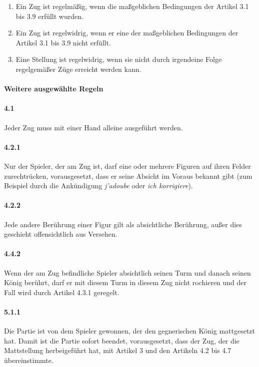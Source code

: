 \documentclass[
  a4paper,
  justified,
  nobib,
]{tufte-handout}
\begin{document}
\begin{enumerate}[{3}.1]
  \begin{enumerate}[{3.10}.1]
    \item Ein Zug ist regelmäßig, wenn die maßgeblichen Bedingungen der Artikel 3.1 bis
      3.9 erfüllt wurden.
    \item Ein Zug ist regelwidrig, wenn er eine der maßgeblichen Bedingungen der Artikel
      3.1 bis 3.9 nicht erfüllt.
    \item Eine Stellung ist regelwidrig, wenn sie nicht durch irgendeine Folge
      regelgemäßer Züge erreicht werden kann.
  \end{enumerate}
\end{enumerate}

\paragraph{Weitere ausgewählte Regeln}%
\label{par:weitere_ausgewahlte_regeln}

\paragraph{4.1} Jeder Zug muss mit einer Hand alleine ausgeführt werden.
\paragraph{4.2.1} Nur der Spieler, der am Zug ist, darf eine oder mehrere Figuren auf
ihren Felder zurechtrücken, vorausgesetzt, dass er seine Absicht im Voraus bekannt gibt
(zum Beispiel durch die Ankündigung \emph{j’adoube} oder \emph{ich korrigiere}).
\paragraph{4.2.2} Jede andere Berührung einer Figur gilt als absichtliche Berührung, außer
dies geschieht offensichtlich aus Versehen.
\paragraph{4.4.2} Wenn der am Zug befindliche Spieler absichtlich seinen Turm und danach
seinen König berührt, darf er mit diesem Turm in diesem Zug nicht rochieren und der Fall
wird durch Artikel 4.3.1 geregelt.
\paragraph{5.1.1} Die Partie ist von dem Spieler gewonnen, der den gegnerischen König
mattgesetzt hat. Damit ist die Partie sofort beendet, vorausgesetzt, dass der Zug, der die
Mattstellung herbeigeführt hat, mit Artikel 3 und den Artikeln 4.2 bis 4.7 übereinstimmte.
\end{document}
